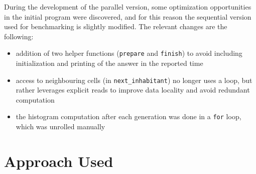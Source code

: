 \documentclass{article}
\begin{document}
During the development of the parallel version, some optimization opportunities in the
initial program were discovered, and for this reason the sequential version used for
benchmarking is slightly modified. The relevant changes are the following:

\begin{itemize}
	\itemsep -0.2em
	\item addition of two helper functions (\texttt{prepare} and \texttt{finish})
		to avoid including initialization and printing of the answer in the reported time

	\item access to neighbouring cells (in \texttt{next\_inhabitant}) no longer uses a
		loop, but rather leverages explicit reads to improve data locality and avoid redundant
		computation

	\item the histogram computation after each generation was done in a
		\texttt{for} loop, which was unrolled manually
\end{itemize}




\section{Approach Used}

\end{document}
